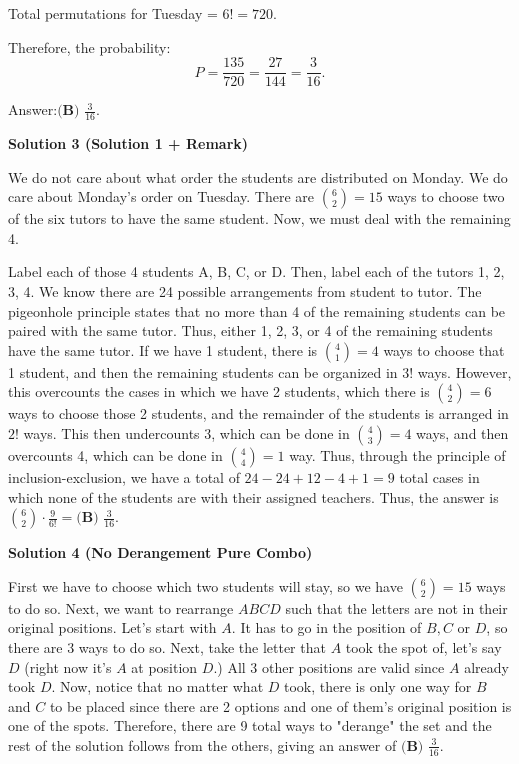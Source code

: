 \begin{enumerate}
 Total permutations for Tuesday = \( 6! = 720 \).

 Therefore, the probability:
 \[P = \frac{135}{720} = \frac{27}{144} = \frac{3}{16}.\]

 Answer:\( \boxed{\textbf{(B) }\frac{3}{16}} \).

 



\textbf{Solution 3 (Solution 1 + Remark)}

We do not care about what order the students are distributed on Monday. We do care about Monday's order on Tuesday. There are \( \binom{6}{2} = 15 \) ways to choose two of the six tutors to have the same student. Now, we must deal with the remaining 4.

 Label each of those 4 students A, B, C, or D. Then, label each of the tutors 1, 2, 3, 4. We know there are 24 possible arrangements from student to tutor. The pigeonhole principle states that no more than 4 of the remaining students can be paired with the same tutor. Thus, either 1, 2, 3, or 4 of the remaining students have the same tutor. If we have 1 student, there is \( \binom{4}{1} = 4 \) ways to choose that 1 student, and then the remaining students can be organized in \( 3! \) ways. However, this overcounts the cases in which we have 2 students, which there is \( \binom{4}{2} = 6 \) ways to choose those 2 students, and the remainder of the students is arranged in \( 2! \) ways. This then undercounts 3, which can be done in \( \binom{4}{3} = 4 \) ways, and then overcounts 4, which can be done in \( \binom{4}{4} = 1 \) way. Thus, through the principle of inclusion-exclusion, we have a total of \( 24-24+12-4+1 = 9 \) total cases in which none of the students are with their assigned teachers. Thus, the answer is $\binom{6}{2} \cdot \frac{9}{6!} = \boxed{\textbf{(B) }\frac{3}{16}}$.

 



\textbf{Solution 4 (No Derangement Pure Combo)}

First we have to choose which two students will stay, so we have \( \binom{6}{2} = 15 \) ways to do so. Next, we want to rearrange $ABCD$ such that the letters are not in their original positions. Let's start with $A$. It has to go in the position of $B, C$ or $D$, so there are $3$ ways to do so. Next, take the letter that $A$ took the spot of, let's say $D$ (right now it's $A$ at position $D$.) All 3 other positions are valid since $A$ already took $D$. Now, notice that no matter what $D$ took, there is only one way for $B$ and $C$ to be placed since there are 2 options and one of them's original position is one of the spots. Therefore, there are 9 total ways to "derange" the set and the rest of the solution follows from the others, giving an answer of $\boxed{\textbf{(B) }\frac{3}{16}}$.


\end{enumerate}
